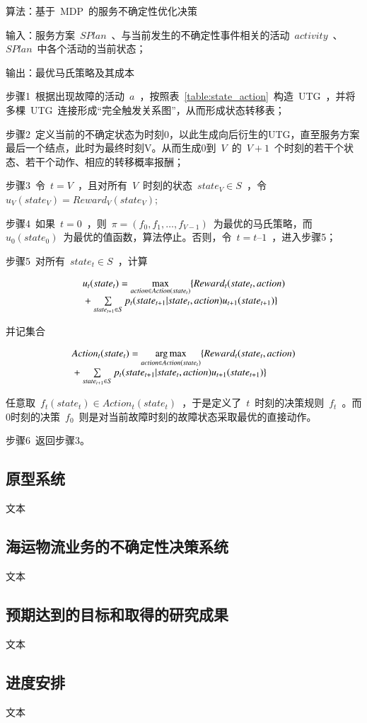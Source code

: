 算法：基于~MDP~的服务不确定性优化决策

输入：服务方案~$SPlan$~、与当前发生的不确定性事件相关的活动~$activity$~、
~$SPlan$~中各个活动的当前状态；

输出：最优马氏策略及其成本

步骤1~根据出现故障的活动~$a$~，按照表~\ref{table:state_action}~构造~UTG~，并将多棵~UTG~连接形成“完全触发关系图”，从而形成状态转移表；

步骤2~定义当前的不确定状态为时刻0，以此生成向后衍生的UTG，直至服务方案最后一个结点，此时为最终时刻V。从而生成0到~$V$~的~$V+1$~个时刻的若干个状态、若干个动作、相应的转移概率报酬；

步骤3~令~$t=V$~，且对所有~$V$~时刻的状态~$state_V \in S$~，令~${u_V}( {state_V} ) = Reward_V( {state_V} )$;

步骤4~如果~$t=0$~，则~$\pi  = (f_0,f_1,\ldots ,f_{V-1})$~为最优的马氏策略，而~${u_0}( state_0)$~为最优的值函数，算法停止。否则，令~$t=t–1$~，进入步骤5；

步骤5~对所有~$state_t \in S$~，计算

\begin{equation}\label{equation:backward_mdp}
\begin{array}{l}
{u_t}(stat{e_t}) = \mathop {\max }\limits_{action \in Action(stat{e_t})} \{ Rewar{d_t}(stat{e_t},action)\\
{\rm{                        }} + \sum\limits_{stat{e_{t + 1}} \in S} {{p_t}(stat{e_{t + 1}}|stat{e_t},action){u_{t + 1}}(stat{e_{t + 1}})} \} 
\end{array}
\end{equation}

并记集合

\begin{equation}\label{equation:backward_mdp_arg}
\begin{array}{l}
Actio{n_t}(stat{e_t}) = \mathop {\arg \max }\limits_{action \in Action(stat{e_t})} \{ Rewar{d_t}(stat{e_t},action)\\
{\rm{                       }} + \sum\limits_{stat{e_{t + 1}} \in S} {{p_t}(stat{e_{t + 1}}|stat{e_t},action){u_{t + 1}}(stat{e_{t + 1}})} \} 
\end{array}
\end{equation}

任意取~$f_t(state_t) \in Action_t(state_t)$~，于是定义了~$t$~时刻的决策规则~$f_t$~。而0时刻的决策~$f_0$~则是对当前故障时刻的故障状态采取最优的直接动作。

步骤6~返回步骤3。


\subsection{原型系统}
文本

\subsection{海运物流业务的不确定性决策系统}
文本


\subsection{预期达到的目标和取得的研究成果}
文本

\subsection{进度安排}
文本
